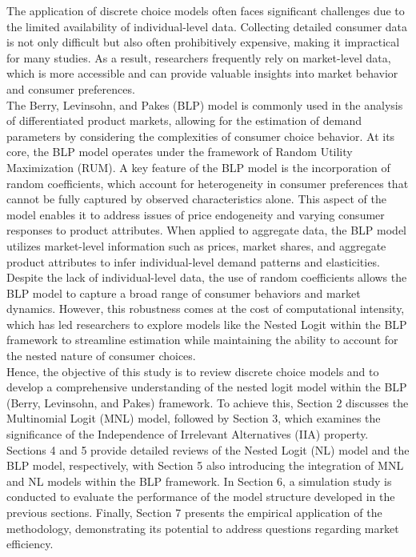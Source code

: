 \documentclass[a4paper,11pt]{article}
\begin{document}
    The application of discrete choice models often faces significant challenges due to the limited availability of individual-level data. Collecting detailed consumer data is not only difficult but also often prohibitively expensive, making it impractical for many studies. As a result, researchers frequently rely on market-level data, which is more accessible and can provide valuable insights into market behavior and consumer preferences.\\

    The Berry, Levinsohn, and Pakes (BLP) model is commonly used in the analysis of differentiated product markets, allowing for the estimation of demand parameters by considering the complexities of consumer choice behavior. At its core, the BLP model operates under the framework of Random Utility Maximization (RUM). A key feature of the BLP model is the incorporation of random coefficients, which account for heterogeneity in consumer preferences that cannot be fully captured by observed characteristics alone. This aspect of the model enables it to address issues of price endogeneity and varying consumer responses to product attributes. When applied to aggregate data, the BLP model utilizes market-level information such as prices, market shares, and aggregate product attributes to infer individual-level demand patterns and elasticities. Despite the lack of individual-level data, the use of random coefficients allows the BLP model to capture a broad range of consumer behaviors and market dynamics. However, this robustness comes at the cost of computational intensity, which has led researchers to explore models like the Nested Logit within the BLP framework to streamline estimation while maintaining the ability to account for the nested nature of consumer choices.\\

    Hence, the objective of this study is to review discrete choice models and to develop a comprehensive understanding of the nested logit model within the BLP (Berry, Levinsohn, and Pakes) framework. To achieve this, Section 2 discusses the Multinomial Logit (MNL) model, followed by Section 3, which examines the significance of the Independence of Irrelevant Alternatives (IIA) property. Sections 4 and 5 provide detailed reviews of the Nested Logit (NL) model and the BLP model, respectively, with Section 5 also introducing the integration of MNL and NL models within the BLP framework. In Section 6, a simulation study is conducted to evaluate the performance of the model structure developed in the previous sections. Finally, Section 7 presents the empirical application of the methodology, demonstrating its potential to address questions regarding market efficiency.\\
\end{document}
